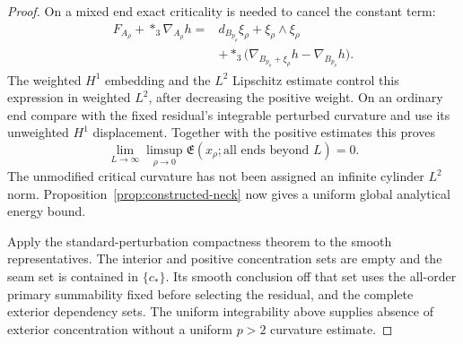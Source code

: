 \documentclass[11pt]{amsart}
\theoremstyle{definition}
\theoremstyle{remark}
\theoremstyle{plain}
\begin{document}
\begin{proof}
On a mixed end exact criticality is needed to cancel the constant term:
\begin{equation}\label{eq:constructed-perturbed-end-curvature}
 \begin{split}
 F_{A_\rho}+*_3\nabla_{A_\rho}h
  ={}&d_{B_{p_\rho}}\xi_\rho+\xi_\rho\wedge\xi_\rho\\
    &+*_3\bigl(\nabla_{B_{p_\rho}+\xi_\rho}h
                            -\nabla_{B_{p_\rho}}h\bigr).
 \end{split}
\end{equation}
The weighted $H^1$ embedding and the $L^2$ Lipschitz estimate control
this expression in weighted $L^2$, after decreasing the positive weight.
On an ordinary end compare with the fixed residual's integrable
perturbed curvature and use its unweighted $H^1$ displacement. Together
with the positive estimates this proves
\begin{equation}\label{eq:constructed-small-end-tails}
 \lim_{L\to\infty}\limsup_{\rho\to0}
       \mathfrak E(x_\rho;\text{all ends beyond }L)=0.
\end{equation}
The unmodified critical curvature has not been assigned an infinite
cylinder $L^2$ norm. Proposition~\ref{prop:constructed-neck} now gives
a uniform global analytical energy bound.

Apply the standard-perturbation compactness theorem
\cite[Theorem~5.2]{DaeFukLip21a} to the smooth representatives. The
interior and positive concentration sets are empty and the seam set is
contained in $\{c_*\}$. Its smooth conclusion off that set uses the
all-order primary summability fixed before selecting the residual, and
the complete exterior dependency sets. The uniform integrability above
supplies absence of exterior concentration without a uniform $p>2$
curvature estimate.


\end{proof}
\end{document}
